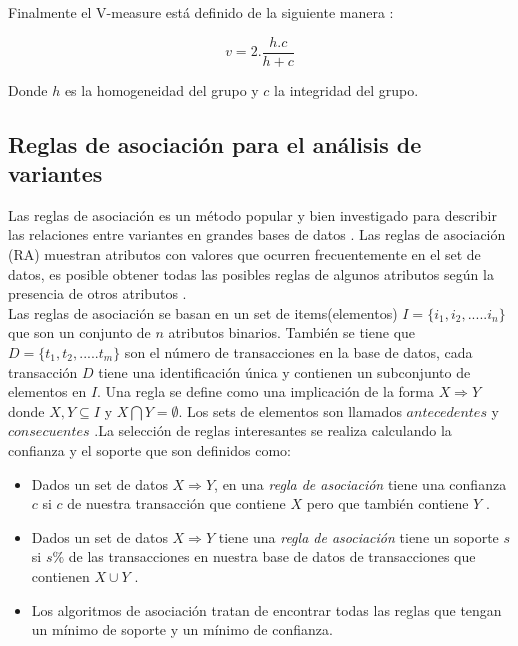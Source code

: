 {Finalmente el V-measure está definido de la siguiente manera \cite{Rosenberg2007}:

$$v= 2.\frac{h.c}{h+c}$$

Donde $h$ es la homogeneidad del grupo  y $c$ la integridad del grupo. 

\subsection{Reglas de asociación para el análisis de variantes}

Las reglas de asociación es un método popular y bien investigado para describir las relaciones entre variantes en grandes bases de datos \cite{Hahsler2005}. Las reglas de asociación (RA) muestran atributos con valores que ocurren frecuentemente en el set de datos, es posible obtener todas las posibles reglas de algunos atributos según la presencia de otros atributos \cite{Karabatak2009}.\\

Las reglas de asociación se basan en un set de items(elementos) $I = \{i_1,i_2,.....i_n \}$ que son un conjunto de $n$ atributos binarios. También se tiene que $D = \{t_1,t_2,..... t_m\}$ son el número de transacciones en la base de datos, cada transacción $D$ tiene una identificación única y contienen un subconjunto de elementos en $I$. Una regla se define como una implicación de la forma $X \Rightarrow Y$ donde $X,Y \subseteq I$ y $X \bigcap Y = \emptyset$. Los sets de elementos son llamados $antecedentes$ y $consecuentes$ \cite{Hahsler2005,Karabatak2009}.La selección de reglas interesantes se realiza calculando la confianza y el soporte que son definidos como:

\begin{itemize}
	\item Dados un set de datos $X \Rightarrow Y$, en una \textit{regla de asociación} tiene una confianza $c$ si $c$ de nuestra transacción que contiene $X$ pero que también contiene $Y$ \cite{Agrawal1994}.
	
	\item Dados un set de datos $X \Rightarrow Y$ tiene una \textit{regla de asociación} tiene un soporte $s$ si $s\%$ de las transacciones en nuestra base de datos de transacciones que contienen $X\cup Y$ \cite{Agrawal1994}. 
	
	\item Los algoritmos de asociación tratan de encontrar todas las reglas que tengan un mínimo de soporte y un mínimo de confianza\cite{Agrawal1994}. 
\end{itemize}

}
